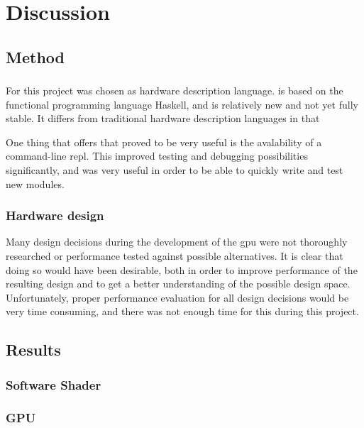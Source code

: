 \chapter{Discussion}
	
	\section{Method}
		
		\subsection{\clash}

			For this project \clash was chosen as hardware description language.
			\clash is based on the functional programming language Haskell, and
			is relatively new and not yet fully stable. It differs from 
			traditional hardware description languages in that 

			One thing that \clash offers that proved to be very useful is the 
			avalability of a command-line repl. This improved testing and 
			debugging possibilities significantly, and was very useful in order
			to be able to quickly write and test new modules.

		\subsection{Hardware design}
			
			Many design decisions during the development of the gpu were not
			thoroughly researched or performance tested against possible
			alternatives. It is clear that doing so would have been desirable,
			both in order to improve performance of the resulting design and to
			get a better understanding of the possible design space. 
			Unfortunately, proper performance evaluation for all design 
			decisions would be very time consuming, and there was not enough 
			time for this during this project.
	
	\section{Results}
		
		\subsection{Software Shader}
		
		\subsection{GPU} 
		
